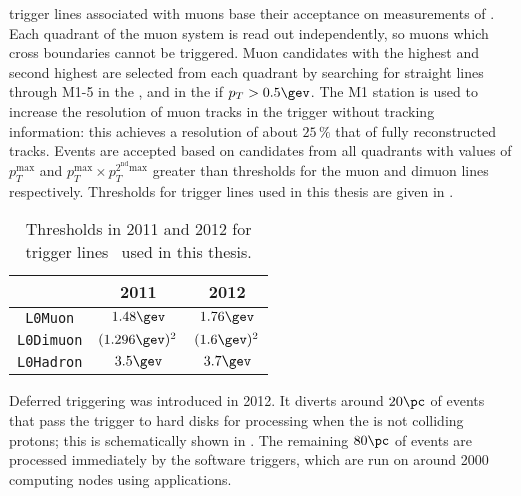 \lone trigger lines associated with muons base their acceptance on measurements of \pt.
Each quadrant of the muon system is read out independently, so muons which cross boundaries cannot
be triggered.
Muon candidates with the highest and second highest \pt are selected from each quadrant by
searching for straight lines through M1-5 in the , and in the  if
$p_T>0.5\gev$.
The M1 station is used to increase the \pt resolution of muon tracks in the trigger without
tracking information: this achieves a resolution of about $25\,\%$ that of fully reconstructed
tracks.
Events are accepted based on candidates from all quadrants with values of $p_T^\mathrm{max}$ and
$p_T^\mathrm{max}\times p_T^\mathrm{2^{nd} max}$ greater than thresholds for the muon and dimuon
lines respectively.
Thresholds for \lone trigger lines used in this thesis are given in .

\begin{table}
  \caption[Level one trigger thresholds]
  {
    Thresholds in 2011 and 2012 for \lone trigger lines~\cite{Albrecht:2013fba} used in this thesis.
  }
  \label{tab:lhcb:trigger}
  \begin{center}
    \begin{tabular}{ccc}\toprule
      &2011&2012\\\midrule
      {\tt L0Muon} & $1.48\gev$ & $1.76\gev$ \\
      {\tt L0Dimuon} & $(1.296\gev)^2$ & $(1.6\gev)^2$ \\
      {\tt L0Hadron} & $3.5\gev$ & $3.7\gev$ \\
      \bottomrule
    \end{tabular}
  \end{center}
\end{table}

Deferred triggering was introduced in 2012.
It diverts around $20\pc$ of events that pass the \lone trigger to hard disks for processing when
the \lhc is not colliding protons; this is schematically shown in .
The remaining $80\pc$ of events are processed immediately by the software triggers, which are
run on around 2000 computing nodes using \cpp applications.

